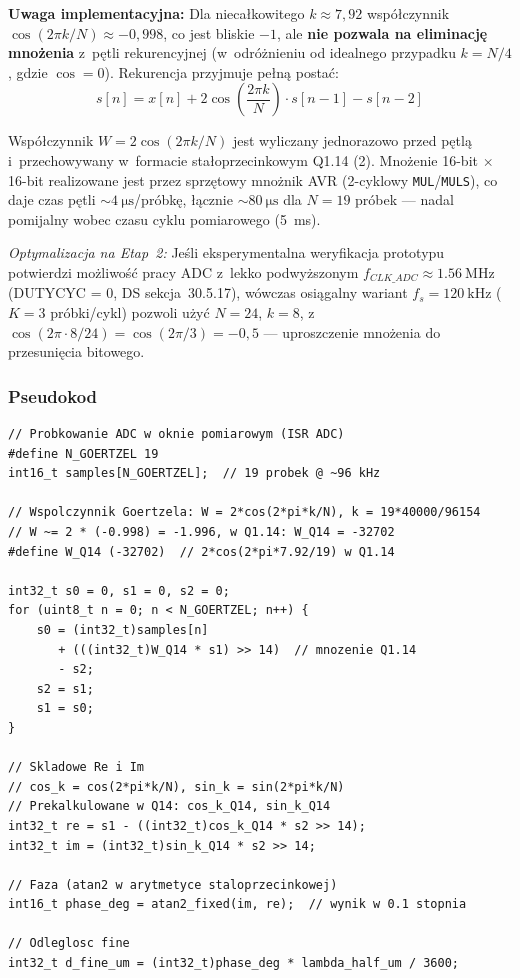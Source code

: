 \documentclass[a4paper,11pt]{article}
\begin{document}
\textbf{Uwaga implementacyjna:} Dla niecałkowitego $k \approx 7{,}92$ współczynnik
$\cos(2\pi k/N) \approx -0{,}998$, co jest bliskie $-1$, ale \textbf{nie pozwala
na eliminację mnożenia} z~pętli rekurencyjnej (w~odróżnieniu od idealnego
przypadku $k = N/4$, gdzie $\cos = 0$). Rekurencja przyjmuje pełną postać:
\begin{equation}
    s[n] = x[n] + 2\cos\!\left(\frac{2\pi k}{N}\right) \cdot s[n-1] - s[n-2]
    \label{eq:goertzel_full}
\end{equation}

Współczynnik $W = 2\cos(2\pi k/N)$ jest wyliczany jednorazowo przed pętlą
i~przechowywany w~formacie stałoprzecinkowym Q1.14 (\SI{2}{\byte}).
Mnożenie 16-bit $\times$ 16-bit realizowane jest przez sprzętowy mnożnik AVR
(2-cyklowy \texttt{MUL}/\texttt{MULS}), co daje czas pętli ${\sim}\SI{4}{\micro\second}$/próbkę,
łącznie ${\sim}\SI{80}{\micro\second}$ dla $N = 19$ próbek --- nadal pomijalny
wobec czasu cyklu pomiarowego (\SI{5}{\milli\second}).

\textit{Optymalizacja na Etap~2:} Jeśli eksperymentalna weryfikacja prototypu
potwierdzi możliwość pracy ADC z~lekko podwyższonym $f_{CLK\_ADC} \approx
\SI{1,56}{\mega\hertz}$ (DUTYCYC = 0, DS sekcja~30.5.17), wówczas
osiągalny wariant $f_s = \SI{120}{\kilo\hertz}$ ($K = 3$ próbki/cykl)
pozwoli użyć $N = 24$, $k = 8$, z~$\cos(2\pi \cdot 8/24) = \cos(2\pi/3) = -0{,}5$
--- uproszczenie mnożenia do przesunięcia bitowego.

\subsubsection{Pseudokod}

\begin{lstlisting}[caption={Algorytm Goertzela --- pelna rekurencja dla $k \approx 7{,}92$, $N = 19$},
                   label={lst:goertzel}]
// Probkowanie ADC w oknie pomiarowym (ISR ADC)
#define N_GOERTZEL 19
int16_t samples[N_GOERTZEL];  // 19 probek @ ~96 kHz

// Wspolczynnik Goertzela: W = 2*cos(2*pi*k/N), k = 19*40000/96154
// W ~= 2 * (-0.998) = -1.996, w Q1.14: W_Q14 = -32702
#define W_Q14 (-32702)  // 2*cos(2*pi*7.92/19) w Q1.14

int32_t s0 = 0, s1 = 0, s2 = 0;
for (uint8_t n = 0; n < N_GOERTZEL; n++) {
    s0 = (int32_t)samples[n]
       + (((int32_t)W_Q14 * s1) >> 14)  // mnozenie Q1.14
       - s2;
    s2 = s1;
    s1 = s0;
}

// Skladowe Re i Im
// cos_k = cos(2*pi*k/N), sin_k = sin(2*pi*k/N)
// Prekalkulowane w Q14: cos_k_Q14, sin_k_Q14
int32_t re = s1 - ((int32_t)cos_k_Q14 * s2 >> 14);
int32_t im = (int32_t)sin_k_Q14 * s2 >> 14;

// Faza (atan2 w arytmetyce staloprzecinkowej)
int16_t phase_deg = atan2_fixed(im, re);  // wynik w 0.1 stopnia

// Odleglosc fine
int32_t d_fine_um = (int32_t)phase_deg * lambda_half_um / 3600;
\end{lstlisting}
\end{document}
